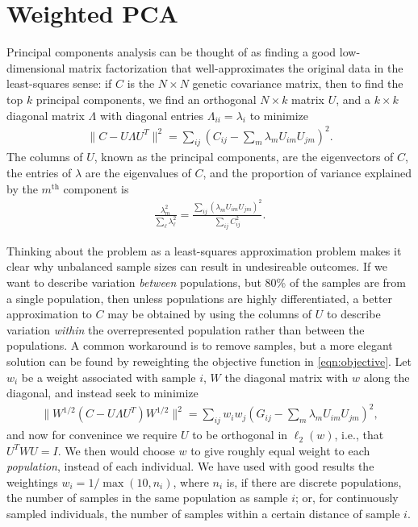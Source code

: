 \documentclass[11pt, oneside]{article}   	%
\begin{document}
\section{Weighted PCA}
\label{apx:weighted_pca}

Principal components analysis can be thought of as finding a good low-dimensional matrix factorization \citep{engelhardt2010analysis}
that well-approximates the original data in the least-squares sense:
if $C$ is the $N \times N$ genetic covariance matrix,
then to find the top $k$ principal components, 
we find an orthogonal $N \times k$ matrix $U$,
and a $k \times k$ diagonal matrix $\Lambda$ with diagonal entries $\Lambda_{ii}=\lambda_i$ to minimize
\begin{align} \label{eqn:objective}
    \| C - U \Lambda U^T \|^2 = \sum_{ij} \left( C_{ij} - \sum_m \lambda_{m} U_{im} U_{jm} \right)^2 .
\end{align}
The columns of $U$, known as the principal components, are the eigenvectors of $C$,
the entries of $\lambda$ are the eigenvalues of $C$, 
and the proportion of variance explained by the $m^\text{th}$ component is
\begin{align*}
    \frac{ \lambda_m^2 }{ \sum_\ell \lambda_\ell^2 } = \frac{ \sum_{ij} ( \lambda_m U_{im} U_{jm} )^2 }{ \sum_{ij} C_{ij}^2 } .
\end{align*}

Thinking about the problem as a least-squares approximation problem
makes it clear why unbalanced sample sizes can result in undesireable outcomes.
If we want to describe variation \emph{between} populations,
but 80\% of the samples are from a single population,
then unless populations are highly differentiated, 
a better approximation to $C$ may be obtained by using the columns of $U$ to describe variation \emph{within} the overrepresented population
rather than between the populations.
A common workaround is to remove samples,
but a more elegant solution can be found by reweighting the objective function in \eqref{eqn:objective}.
Let $w_{i}$ be a weight associated with sample $i$,
$W$ the diagonal matrix with $w$ along the diagonal,
and instead seek to minimize
\begin{align} \label{eqn:weighted_objective}
    \| W^{1/2} (C - U \Lambda U^T) W^{1/2} \|^2 = \sum_{ij} w_i w_j \left( G_{ij} - \sum_m \lambda_{m} U_{im} U_{jm} \right)^2 ,
\end{align}
and now for convenince we require $U$ to be orthogonal in $\ell_2(w)$, i.e., that $U^T W U =I$.
We then would choose $w$ to give roughly equal weight to each \emph{population},
instead of each individual.
We have used with good results the weightings
$w_i = 1/\max(10,n_i)$,
where $n_i$ is, if there are discrete populations,
the number of samples in the same population as sample $i$;
or, for continuously sampled individuals,
the number of samples within a certain distance of sample $i$.
\end{document}
